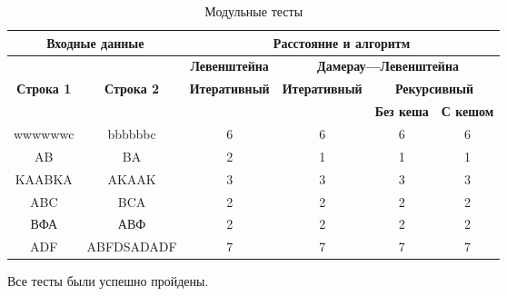 \begin{table}[!ht]
	
	\begin{center}
		\small
		\begin{threeparttable}
		\caption{Модульные тесты}
        \label{t:unit_tests}
		\begin{tabular}{|c|c|c|c|c|c|}
			\hline
			\multicolumn{2}{|c|}{\bfseries Входные данные}
			& \multicolumn{4}{c|}{\bfseries Расстояние и алгоритм} \\ 
			\hline 
			&
			& \multicolumn{1}{c|}{\bfseries Левенштейна} 
			& \multicolumn{3}{c|}{\bfseries Дамерау---Левенштейна} \\ \cline{3-6}
			
			\bfseries Строка 1 & \bfseries Строка 2 & \bfseries Итеративный & \bfseries Итеративный
			
			& \multicolumn{2}{c|}{\bfseries Рекурсивный} \\ \cline{5-6}
			& & & & \bfseries Без кеша & \bfseries С кешом \\
			\hline
			wwwwwwc & bbbbbbc & 6 & 6 & 6 & 6 \\
			\hline
			AB & BA & 2 & 1 & 1 & 1 \\
			\hline
			KAABKA & AKAAK & 3 & 3 & 3 & 3 \\
			\hline
			ABC & BCA & 2 & 2 & 2 & 2 \\
			\hline
			ВФА & АВФ & 2 & 2 & 2 & 2 \\
			\hline
			ADF & ABFDSADADF & 7 & 7 & 7 & 7 \\
			\hline
		\end{tabular}	
		\end{threeparttable}
	\end{center}
\end{table}

Все тесты были успешно пройдены.